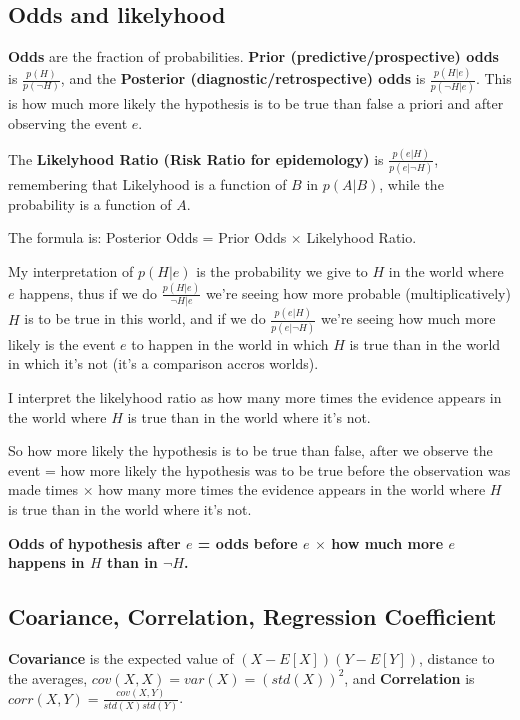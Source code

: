 \subsection{Odds and likelyhood}

\textbf{Odds} are the fraction of probabilities. \textbf{Prior (predictive/prospective) odds} is $\frac{p(H)}{p(\neg H)}$, and the \textbf{Posterior (diagnostic/retrospective) odds} is $\frac{p(H|e)}{p(\neg H|e)}$. This is how much more likely the hypothesis is to be true than false a priori and after observing the event $e$. 

The \textbf{Likelyhood Ratio (Risk Ratio for epidemology)} is $\frac{p(e|H)}{p(e|\neg H)}$, remembering that Likelyhood is a function of $B$ in $p(A|B)$, while the probability is a function of $A$.

The formula is: Posterior Odds = Prior Odds $\times$ Likelyhood Ratio.

My interpretation of $p(H|e)$ is the probability we give to $H$ in the world where $e$ happens, thus if we do $\frac{p(H|e)}{\neg H|e}$ we're seeing how more probable (multiplicatively) $H$ is to be true in this world, and if we do $\frac{p(e|H)}{p(e|\neg H)}$ we're seeing how much more likely is the event $e$ to happen in the world in which $H$ is true than in the world in which it's not (it's a comparison accros worlds).

I interpret the likelyhood ratio as how many more times the evidence appears in the world where $H$ is true than in the world where it's not.

So how more likely the hypothesis is to be true than false, after we observe the event = how more likely the hypothesis was to be true before the observation was made times $\times$ how many more times the evidence appears in the world where $H$ is true than in the world where it's not.

\textbf{Odds of hypothesis after $e$ = odds before $e$ $\times$ how much more $e$ happens in $H$ than in $\neg H$.}

\subsection{Coariance, Correlation, Regression Coefficient}

\textbf{Covariance} is the expected value of $(X-E[X])(Y-E[Y])$, distance to the averages, $cov(X,X) = var(X) = (std(X))^2$, and \textbf{Correlation} is $corr(X,Y) = \frac{cov(X,Y)}{std(X)std(Y)}$.

